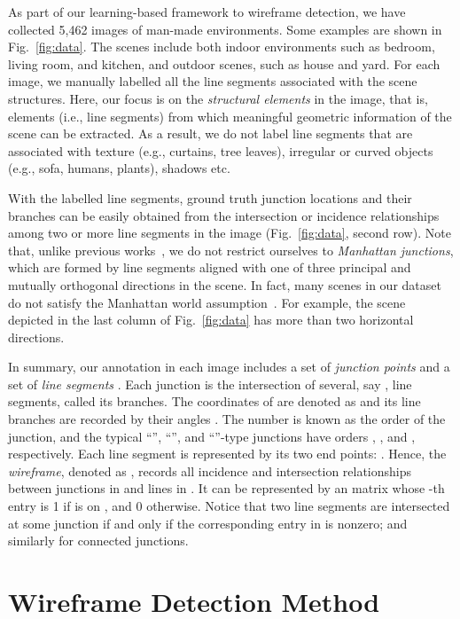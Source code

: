 \documentclass[10pt,twocolumn,letterpaper]{article}
\begin{document}
As part of our learning-based framework to wireframe detection, we have collected 5,462 images of man-made environments. Some examples are shown in Fig.~\ref{fig:data}. The scenes include both indoor environments such as bedroom, living room, and kitchen, and outdoor scenes, such as house and yard. For each image, we manually labelled all the line segments associated with the scene structures. Here, our focus is on the \emph{structural elements} in the image, that is, elements (i.e., line segments) from which meaningful geometric information of the scene can be extracted. As a result, we do not label line segments that are associated with texture (e.g., curtains, tree leaves), irregular or curved objects (e.g., sofa, humans, plants), shadows etc.

With the labelled line segments, ground truth junction locations and their branches can be easily obtained from the intersection or incidence relationships among two or more line segments in the image (Fig.~\ref{fig:data}, second row). Note that, unlike previous works~\cite{RamalingamPJT13, RamalingamB13}, we do not restrict ourselves to \emph{Manhattan junctions}, which are formed by line segments aligned with one of three principal and mutually orthogonal directions in the scene. In fact, many scenes in our dataset do not satisfy the Manhattan world assumption~\cite{CoughlanY03}. For example, the scene depicted in the last column of Fig.~\ref{fig:data} has more than two horizontal directions.

In summary, our annotation in each image includes a set of {\em junction points}  and a set of {\em line segments} . Each junction  is the intersection of several, say , line segments, called its branches. The coordinates of  are denoted as  and its line branches are recorded by their angles . The number  is known as the order of the junction, and the typical ``'', ``'', and ``''-type junctions have orders , , and , respectively. Each line segment is represented by its two end points: . Hence, the {\em wireframe}, denoted as , records all incidence and intersection relationships between junctions in  and lines in . It can be represented by an  matrix  whose -th entry is 1 if  is on , and 0 otherwise. Notice that two line segments are intersected at some junction if and only if the corresponding entry in   is nonzero; and similarly  for connected junctions. 

\section{Wireframe Detection Method}
\end{document}
